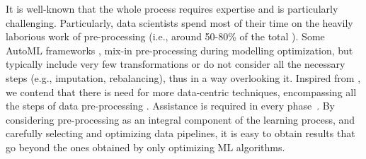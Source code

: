 It is well-known that the whole process requires expertise and is particularly challenging.
Particularly, data scientists spend most of their time on the heavily laborious work of pre-processing (i.e., around 50-80\% of the total \cite{Munson09Pre}).
Some AutoML frameworks \cite{auto_sklearn, mohr2018ml}, mix-in pre-processing during modelling optimization, but typically include very few transformations or do not consider all the necessary steps (e.g., imputation, rebalancing), thus in a way overlooking it.
Inspired from \cite{Munoz09DOLAP}, we contend that there is need for more data-centric techniques, encompassing all the steps of data pre-processing \cite{Vaisman14Book}.
Assistance is required in every phase~\cite{Bilalli16IOTBD}.
By considering pre-processing as an integral component of the learning process, and carefully selecting and optimizing data pipelines, it is easy to obtain results that go beyond the ones obtained by only optimizing ML algorithms.

